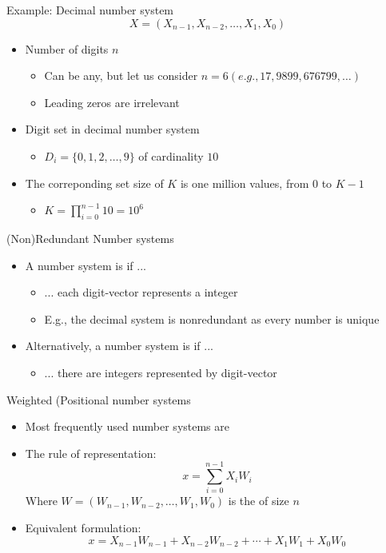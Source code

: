 \begin{parag}{Example: Decimal number system}
    \[X = (X_{n-1}, X_{n-2}, \dots, X_1, X_0)\]
    \begin{itemize}
        \item Number of digits $n$
        \begin{itemize}
            \item Can be any, but let us consider $n = 6 (e.g., 17, 9899, 676799, \dots)$
            \item Leading zeros are irrelevant
        \end{itemize}
        \item Digit set in decimal number system
        \begin{itemize}
            \item $D_i = \{0, 1, 2, \dots, 9\}$ of cardinality $10$
        \end{itemize}
        \item The correponding set size of $K$ is one million values, from $0$ to $K-1$
        \begin{itemize}
            \item $K = \prod_{i = 0}^{n-1} 10 = 10^6$
        \end{itemize}
    \end{itemize}
\end{parag}
\begin{parag}{(Non)Redundant Number systems}
    \begin{itemize}
        \item A number system is  if ...
        \begin{itemize}
            \item ... each digit-vector represents a  integer
            \item E.g., the decimal system is nonredundant as every number is unique
        \end{itemize}
        \item Alternatively, a number system is  if ...
        \begin{itemize}
            \item ... there are integers represented by  digit-vector
        \end{itemize}
    \end{itemize}
\end{parag}
\begin{parag}{Weighted (Positional number systems}
    \begin{itemize}
        \item Most frequently used number systems are 
        \item The rule of representation:
        \[x = \sum_{i = 0}^{n-1} X_i W_i\]
        Where $W = (W_{n-1}, W_{n-2}, \dots, W_1, W_0)$ is the  of size $n$
        \item Equivalent formulation:
        \[x = X_{n-1}W_{n-1} + X_{n-2}W_{n-2} + \cdots + X_1W_1 + X_0 W_0\]
    \end{itemize}
\end{parag}
